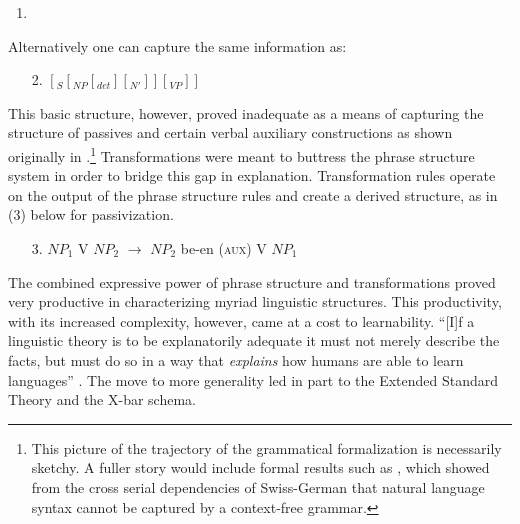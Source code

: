 \documentclass[output=paper]{langscibook}
\begin{document}
\begin{enumerate}
\item \leavevmode\vadjust{\vspace{-\baselineskip}}\newline
{}
\end{enumerate}

Alternatively one can capture the same information as:
\begin{enumerate}
    \item[2.] $[_S[_{NP}[_{det}][_{N'}]][_{VP}]]$
\end{enumerate} 

This basic structure, however, proved inadequate as a means of capturing the structure of passives and certain verbal auxiliary constructions as shown originally in \cite{Postal1964}.\footnote{This picture of the trajectory of the grammatical formalization is necessarily sketchy. A fuller story would include formal results such as \cite{Shieber1985}, which showed from the cross serial dependencies of Swiss-German that natural language syntax cannot be captured by a context-free grammar.} Transformations were meant to buttress the phrase structure system in order to bridge this gap in explanation. Transformation rules operate on the output of the phrase structure rules and create a derived structure, as in (3) below for passivization.

\begin{enumerate}
    \item[3.] $NP_1$ V $NP_2$ $\rightarrow$ $NP_2$ be-en (\textsc{aux}) V $NP_1$
\end{enumerate} 

The combined expressive power of phrase structure and transformations proved very productive in characterizing myriad linguistic structures. This productivity, with its increased complexity, however, came at a cost to learnability. ``[I]f a linguistic theory is to be explanatorily adequate it must not merely describe the facts, but must do so in a way that \emph{explains} how humans are able to learn languages'' \citep[15]{Ludlow2011}. The move to more generality led in part to the Extended Standard Theory and the X-bar schema.   
\end{document}
